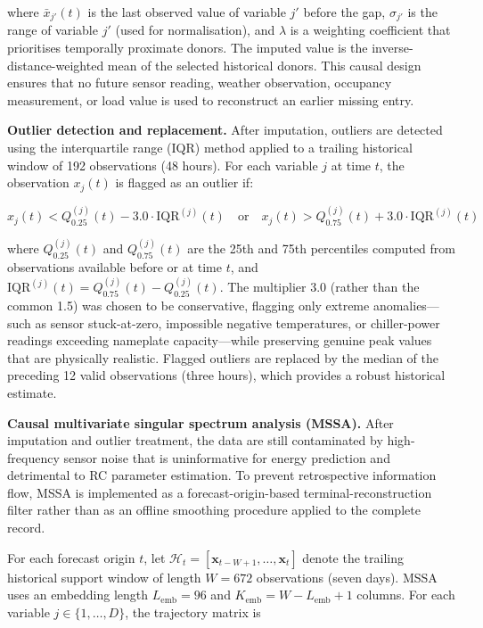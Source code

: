 \documentclass[11pt]{article}
\begin{document}
where $\bar{x}_{j'}(t)$ is the last observed value of variable $j'$ before the gap, $\sigma_{j'}$ is the range of variable $j'$ (used for normalisation), and $\lambda$ is a weighting coefficient that prioritises temporally proximate donors. The imputed value is the inverse-distance-weighted mean of the selected historical donors. This causal design ensures that no future sensor reading, weather observation, occupancy measurement, or load value is used to reconstruct an earlier missing entry.

\textbf{Outlier detection and replacement.} After imputation, outliers are detected using the interquartile range (IQR) method applied to a trailing historical window of 192 observations (48 hours). For each variable $j$ at time $t$, the observation $x_j(t)$ is flagged as an outlier if:

\begin{equation}
x_j(t) < Q_{0.25}^{(j)}(t) - 3.0 \cdot \text{IQR}^{(j)}(t) \quad \text{or} \quad x_j(t) > Q_{0.75}^{(j)}(t) + 3.0 \cdot \text{IQR}^{(j)}(t)
\end{equation}

where $Q_{0.25}^{(j)}(t)$ and $Q_{0.75}^{(j)}(t)$ are the 25th and 75th percentiles computed from observations available before or at time $t$, and $\text{IQR}^{(j)}(t) = Q_{0.75}^{(j)}(t) - Q_{0.25}^{(j)}(t)$. The multiplier 3.0 (rather than the common 1.5) was chosen to be conservative, flagging only extreme anomalies---such as sensor stuck-at-zero, impossible negative temperatures, or chiller-power readings exceeding nameplate capacity---while preserving genuine peak values that are physically realistic. Flagged outliers are replaced by the median of the preceding 12 valid observations (three hours), which provides a robust historical estimate.

\textbf{Causal multivariate singular spectrum analysis (MSSA).} After imputation and outlier treatment, the data are still contaminated by high-frequency sensor noise that is uninformative for energy prediction and detrimental to RC parameter estimation. To prevent retrospective information flow, MSSA is implemented as a forecast-origin-based terminal-reconstruction filter rather than as an offline smoothing procedure applied to the complete record.

For each forecast origin $t$, let $\mathcal{H}_{t}=[\mathbf{x}_{t-W+1},\ldots,\mathbf{x}_{t}]$ denote the trailing historical support window of length $W=672$ observations (seven days). MSSA uses an embedding length $L_{\mathrm{emb}}=96$ and $K_{\mathrm{emb}}=W-L_{\mathrm{emb}}+1$ columns. For each variable $j\in\{1,\ldots,D\}$, the trajectory matrix is
\end{document}
